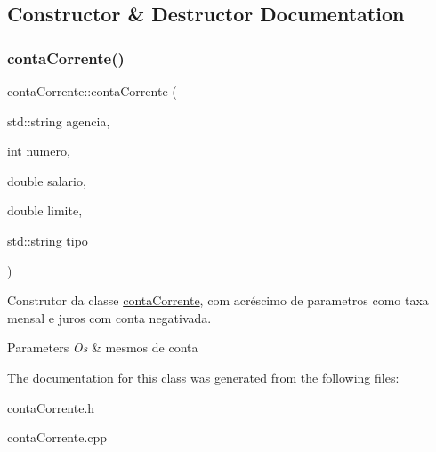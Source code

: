 \subsection{Constructor \& Destructor Documentation}
\mbox{\label{classcontaCorrente_a393be16c11b3a9344a53836d105dc86b}} 
\subsubsection{\texorpdfstring{conta\+Corrente()}{contaCorrente()}}
{\footnotesize\ttfamily conta\+Corrente\+::conta\+Corrente (\begin{DoxyParamCaption}\item[{std\+::string}]{agencia,  }\item[{int}]{numero,  }\item[{double}]{salario,  }\item[{double}]{limite,  }\item[{std\+::string}]{tipo }\end{DoxyParamCaption})}



Construtor da classe \mbox{\hyperlink{classcontaCorrente}{conta\+Corrente}}, com acréscimo de parametros como taxa mensal e juros com conta negativada. 


\begin{DoxyParams}{Parameters}
{\em Os} & mesmos de conta \\
\hline
\end{DoxyParams}


The documentation for this class was generated from the following files\+:\begin{DoxyCompactItemize}
\item 
conta\+Corrente.\+h\item 
conta\+Corrente.\+cpp\end{DoxyCompactItemize}
